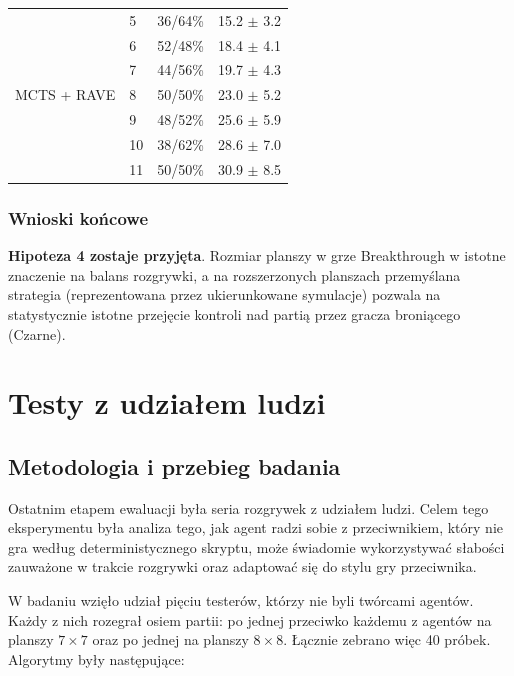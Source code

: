 \documentclass{article}
\begin{document}
\begin{table}[H]
\begin{tabular}{|p{1.5cm}|p{1.8cm}|p{2.7cm}|p{2.1cm}|}
        \multirow{7}{1.5cm}{MCTS + RAVE}
            & \hfill 5  & \hfill 36/64\% & \hfill 15.2 $\pm$ 3.2 \\
            & \hfill 6  & \hfill 52/48\% & \hfill 18.4 $\pm$ 4.1 \\
            & \hfill 7  & \hfill 44/56\% & \hfill 19.7 $\pm$ 4.3 \\
            & \hfill 8  & \hfill 50/50\% & \hfill 23.0 $\pm$ 5.2 \\
            & \hfill 9  & \hfill 48/52\% & \hfill 25.6 $\pm$ 5.9 \\
            & \hfill 10 & \hfill 38/62\% & \hfill 28.6 $\pm$ 7.0 \\
            & \hfill 11 & \hfill 50/50\% & \hfill 30.9 $\pm$ 8.5 \\
        \hline

    \end{tabular}
\end{table}

\subsubsection{Wnioski końcowe}

\textbf{Hipoteza 4 zostaje przyjęta}. Rozmiar planszy w grze Breakthrough w istotne znaczenie na balans rozgrywki, a na rozszerzonych planszach przemyślana strategia (reprezentowana przez ukierunkowane symulacje) pozwala na statystycznie istotne przejęcie kontroli nad partią przez gracza broniącego (Czarne).

\newpage
\section{Testy z udziałem ludzi}

\subsection{Metodologia i przebieg badania}

Ostatnim etapem ewaluacji była seria rozgrywek z udziałem ludzi. Celem tego eksperymentu była analiza tego, jak agent radzi sobie z przeciwnikiem, który nie gra według deterministycznego skryptu, może świadomie wykorzystywać słabości zauważone w trakcie rozgrywki oraz adaptować się do stylu gry przeciwnika.

W badaniu wzięło udział pięciu testerów, którzy nie byli twórcami agentów. Każdy z nich rozegrał osiem partii: po jednej przeciwko każdemu z agentów na planszy $7 \times 7$ oraz po jednej na planszy $8 \times 8$. Łącznie zebrano więc 40 próbek. Algorytmy były następujące:
\end{document}
